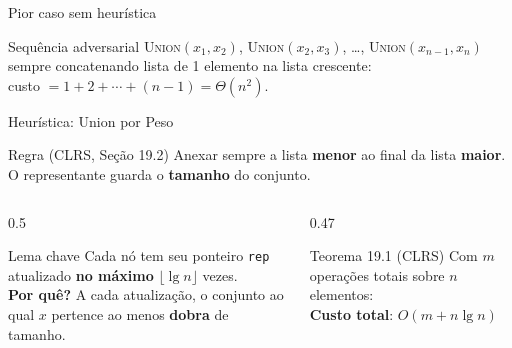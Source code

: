 \documentclass[aspectratio=169]{beamer}
\begin{document}
\begin{frame}{Pior caso sem heurística}%
  \begin{alertblock}{Sequência adversarial}
    \textsc{Union}$(x_1,x_2)$, \textsc{Union}$(x_2,x_3)$, \ldots, \textsc{Union}$(x_{n-1},x_n)$\\
    sempre concatenando lista de 1 elemento na lista crescente:\\
    custo $= 1 + 2 + \cdots + (n-1) = \Theta(n^2)$.
  \end{alertblock}
  \vspace{0.3cm}
  \begin{center}
  \end{center}
\end{frame}

\begin{frame}{Heurística: Union por Peso}%
  \begin{block}{Regra (CLRS, Seção 19.2)}
    Anexar sempre a lista \textbf{menor} ao final da lista \textbf{maior}.\\
    O representante guarda o \textbf{tamanho} do conjunto.
  \end{block}
  \vspace{0.3cm}
  \begin{columns}[T]
    \begin{column}{0.5\textwidth}
      \begin{exampleblock}{Lema chave}
        Cada nó tem seu ponteiro \texttt{rep} atualizado \textbf{no máximo} $\lfloor\lg n\rfloor$ vezes.\\[4pt]
        \textbf{Por quê?} A cada atualização, o conjunto ao qual $x$ pertence ao menos \textbf{dobra} de tamanho.
      \end{exampleblock}
    \end{column}
    \begin{column}{0.47\textwidth}
      \begin{block}{Teorema 19.1 (CLRS)}
        Com $m$ operações totais sobre $n$ elementos:\\[4pt]
        \textbf{Custo total}: $O(m + n\lg n)$
      \end{block}
    \end{column}
  \end{columns}
\end{frame}
\end{document}
